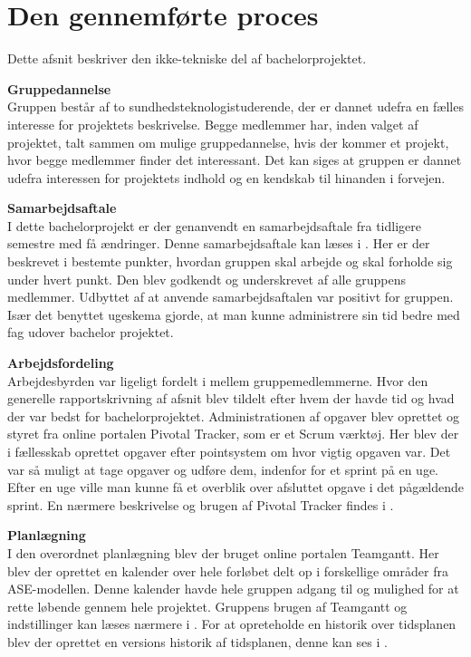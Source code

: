 \section{Den gennemførte proces}

Dette afsnit beskriver den ikke-tekniske del af bachelorprojektet.

\textbf{Gruppedannelse}\\
Gruppen består af to sundhedsteknologistuderende, der er dannet udefra en fælles interesse for projektets beskrivelse. Begge medlemmer har, inden valget af projektet, talt sammen om mulige gruppedannelse, hvis der kommer et projekt, hvor begge medlemmer finder det interessant. Det kan siges at gruppen er dannet udefra interessen for projektets indhold og en kendskab til hinanden i forvejen. 

\textbf{Samarbejdsaftale}\\
I dette bachelorprojekt er der genanvendt en samarbejdsaftale fra tidligere semestre med få ændringer. Denne samarbejdsaftale kan læses i . Her er der beskrevet i bestemte punkter, hvordan gruppen skal arbejde og skal forholde sig under hvert punkt. Den blev godkendt og underskrevet af alle gruppens medlemmer. Udbyttet af at anvende samarbejdsaftalen var positivt for gruppen. Især det benyttet ugeskema gjorde, at man kunne administrere sin tid bedre med fag udover bachelor projektet. 

\textbf{Arbejdsfordeling}\\
Arbejdesbyrden var ligeligt fordelt i mellem gruppemedlemmerne. Hvor den generelle rapportskrivning af afsnit blev tildelt efter hvem der havde tid og hvad der var bedst for bachelorprojektet. Administrationen  af opgaver blev oprettet og styret fra online portalen Pivotal Tracker, som er et Scrum værktøj. Her blev der i fællesskab oprettet opgaver efter pointsystem om hvor vigtig opgaven var. Det var så muligt at tage opgaver og udføre dem, indenfor for et sprint på en uge. Efter en uge ville man kunne få et overblik over afsluttet opgave i det pågældende sprint. En nærmere beskrivelse og brugen af Pivotal Tracker findes i .

\textbf{Planlægning}\\
I den overordnet planlægning blev der bruget online portalen Teamgantt. Her blev der oprettet en kalender over hele forløbet delt op i forskellige områder fra ASE-modellen. Denne kalender havde hele gruppen adgang til og mulighed for at rette løbende gennem hele projektet. Gruppens brugen af Teamgantt og indstillinger kan læses nærmere i . For at opreteholde en historik over tidsplanen blev der oprettet en versions historik af tidsplanen, denne kan ses i .

